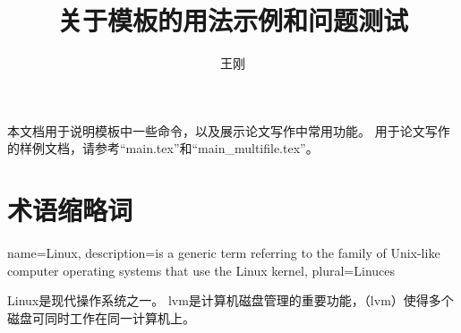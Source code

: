 \documentclass[doctor]{thesis-uestc}
\title{关于模板的用法示例和问题测试}
\author{王刚}
\begin{document}
\thesisglossarylist

\thesischapterexordium
本文档用于说明模板中一些命令，以及展示论文写作中常用功能。
用于论文写作的样例文档，请参考``main.tex''和``main\_multifile.tex''。


\chapter{术语缩略词}

{
  name=Linux,
  description={is a generic term referring to the family of Unix-like
    computer operating systems that use the Linux kernel},
  plural=Linuces
}

\gls{Linux}是现代操作系统之一。
\gls{lvm}是计算机磁盘管理的重要功能，（\gls{lvm}）使得多个磁盘可同时工作在同一计算机上。
\end{document}
